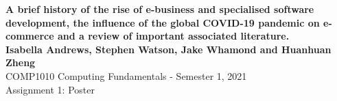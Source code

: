\documentclass[a0,portrait]{a0poster}
\begin{document}
\begin{minipage}[t]{0.95\linewidth}
\vspace{0.5cm}
\begin{center}
\Huge \color{red} \textbf{A brief history of the rise of e-business and specialised software development, the influence of the global COVID-19 pandemic on e-commerce and a review of important associated literature.} \color{Black} \\ [0.5cm]%
\Large \textbf{Isabella Andrews, Stephen Watson, Jake Whamond and Huanhuan Zheng} \\ [0.5cm] %
\Large COMP1010 Computing Fundamentals - Semester 1, 2021 \\ Assignment 1: Poster \\ [0.4cm]
\end{center}
\end{minipage}
\vspace{1cm}
\end{document}

